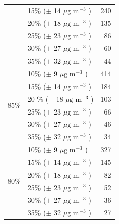 \begin{table}[H]
\begin{tabular}{|l|l|r|}
                        &            15\% ($\pm$ 14  $\mu \text{g m}^{-3}$ )    &        240                   \\ \cline{2-3} 
                        &            20\% ($\pm$ 18  $\mu \text{g m}^{-3}$ )    &        135                   \\ \cline{2-3} 
                        &            25\% ($\pm$ 23  $\mu \text{g m}^{-3}$ )    &        86                    \\ \cline{2-3} 
                        &            30\% ($\pm$ 27  $\mu \text{g m}^{-3}$ )    &        60                    \\ \cline{2-3} 
                        &            35\% ($\pm$ 32  $\mu \text{g m}^{-3}$ )    &        44                    \\ \hline
\multirow{6}{*}{85\%}   &            10\% ($\pm$ 9   $\mu \text{g m}^{-3}$ )    &        414                   \\ \cline{2-3} 
                        &            15\% ($\pm$ 14  $\mu \text{g m}^{-3}$ )    &        184                   \\ \cline{2-3} 
                        &            20 \% ($\pm$ 18 $\mu \text{g m}^{-3}$ )    &        103                   \\ \cline{2-3} 
                        &            25\% ($\pm$ 23  $\mu \text{g m}^{-3}$ )    &        66                    \\ \cline{2-3} 
                        &            30\% ($\pm$ 27  $\mu \text{g m}^{-3}$ )    &        46                    \\ \cline{2-3} 
                        &            35\% ($\pm$ 32  $\mu \text{g m}^{-3}$ )    &        34                    \\ \hline
\multirow{6}{*}{80\%}   &            10\% ($\pm$ 9   $\mu \text{g m}^{-3}$ )    &        327                   \\ \cline{2-3} 
                        &            15\% ($\pm$ 14  $\mu \text{g m}^{-3}$ )    &        145                   \\ \cline{2-3} 
                        &            20\% ($\pm$ 18  $\mu \text{g m}^{-3}$ )    &        82                    \\ \cline{2-3} 
                        &            25\% ($\pm$ 23  $\mu \text{g m}^{-3}$ )    &        52                    \\ \cline{2-3} 
                        &            30\% ($\pm$ 27  $\mu \text{g m}^{-3}$ )    &        36                    \\ \cline{2-3} 
                        &            35\% ($\pm$ 32   $\mu \text{g m}^{-3}$ )   &        27                    \\ \hline
\end{tabular}
\label{tab:no2_samples_needed}
\end{table}

